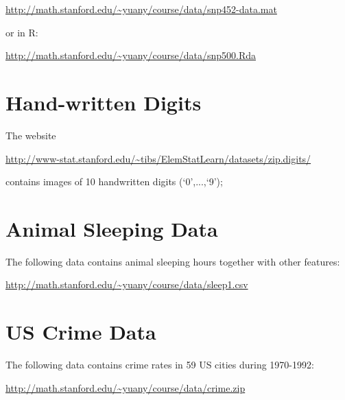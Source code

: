 \documentclass[11pt]{article}
\begin{document}
\url{http://math.stanford.edu/~yuany/course/data/snp452-data.mat} 

\noindent or in R: 

\url{http://math.stanford.edu/~yuany/course/data/snp500.Rda}


\section{Hand-written Digits} The website 

\url{http://www-stat.stanford.edu/\~tibs/ElemStatLearn/datasets/zip.digits/}

\noindent contains images of 10 handwritten digits (`$0$',...,`9');

\section{Animal Sleeping Data} The following data contains animal sleeping hours together with other features: 

\url{http://math.stanford.edu/~yuany/course/data/sleep1.csv}


\section{US Crime Data} The following data contains crime rates in 59 US cities during 1970-1992:

\url{http://math.stanford.edu/~yuany/course/data/crime.zip}

%
%
%
%
%
\end{document}
